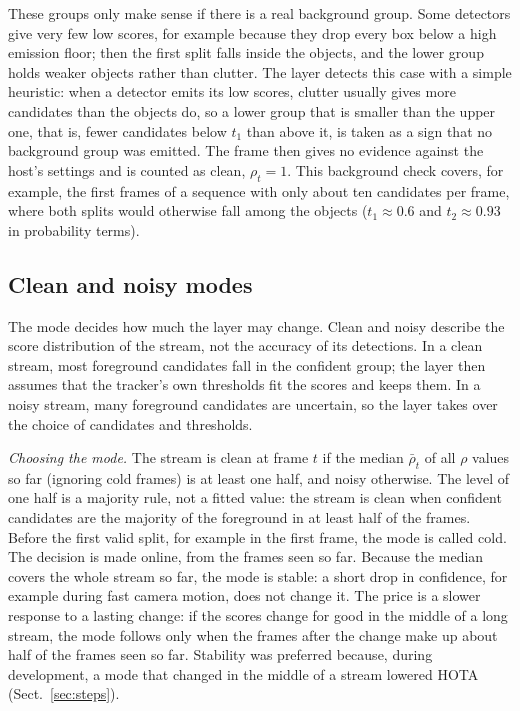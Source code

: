 These groups only make sense if there is a real background group. Some
detectors give very few low scores, for example because they drop every box
below a high emission floor; then the first split falls inside the objects,
and the lower group holds weaker objects rather than clutter. The layer
detects this case with a simple heuristic: when a detector emits its low
scores, clutter usually gives more candidates than the objects do, so a lower
group that is smaller than the upper one, that is, fewer candidates below
$t_1$ than above it, is taken as a sign that no background group was emitted.
The frame then gives no evidence against the host's settings and is counted
as clean, $\rho_t=1$. This background
check covers, for example, the first frames of a sequence with only about
ten candidates per frame, where both splits would otherwise fall among the
objects ($t_1\approx0.6$ and $t_2\approx0.93$ in probability terms).

\subsection{Clean and noisy modes}\label{sec:regimes}
The mode decides how much the layer may change. Clean and noisy describe the
score distribution of the stream, not the accuracy of its detections. In a
clean stream, most foreground candidates fall in the confident group; the
layer then assumes that the tracker's own thresholds fit the scores and keeps
them. In a noisy stream, many foreground candidates are uncertain, so the
layer takes over the choice of candidates and thresholds.

\emph{Choosing the mode.} The stream is clean at frame $t$ if the median
$\bar\rho_t$ of all $\rho$ values so far (ignoring cold frames) is at least
one half, and noisy otherwise. The level of one half is a majority rule, not
a fitted value: the stream is clean when confident candidates are the
majority of the foreground in at least half of the frames. Before the first valid split, for
example in the first frame, the mode is called cold. The decision is made
online, from the frames seen so far. Because the median covers the whole
stream so far, the mode is stable: a short drop in confidence, for example
during fast camera motion, does not change it. The price is a slower response
to a lasting change: if the scores change for good in the middle of a long
stream, the mode follows only when the frames after the change make up about
half of the frames seen so far. Stability was preferred because, during
development, a mode that changed in the middle of a stream lowered HOTA
(Sect.~\ref{sec:steps}).

